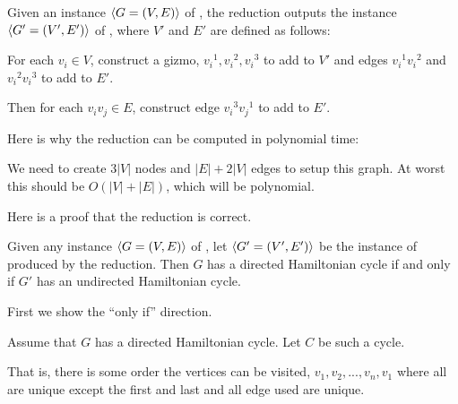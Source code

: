 \documentclass[11pt]{article}
\begin{document}
\begin{problems}


  \problem %

  Given an instance $\langle G=(V,E) \rangle$ of ,
  the reduction outputs the instance $\langle G'=(V',E') \rangle$ of ,
  where $V'$ and $E'$ are defined as follows:

  \lineacross 
  For each $v_i \in V$, construct a gizmo, ${v_i}^1, {v_i}^2, {v_i}^3$ to add to $V'$ and edges ${v_i}^1{v_i}^2$ and ${v_i}^2{v_i}^3$ to add to $E'$.

  Then for each $v_iv_j \in E$, construct edge ${v_i}^3{v_j}^1$ to add to $E'$.
  \lineacross 

  \medskip 
  Here is why the reduction can be computed in polynomial time:

  \lineacross 
  We need to create $3|V|$ nodes and $|E| + 2|V|$ edges to setup this graph. At worst this should be $O(|V| + |E|)$, which will be polynomial.
  \lineacross 

  \medskip 
  Here is a proof that the reduction is correct.
  \begin{lemma}
    Given any instance $\langle G=(V,E) \rangle$ of ,
    let $\langle G'=(V',E') \rangle$ be the instance of  produced by the reduction.
    Then $G$ has a directed Hamiltonian cycle 
    if and only if $G'$ has an undirected Hamiltonian cycle.
  \end{lemma}
  \begin{longFormProof}
    \step First we show the ``only if'' direction.
    \begin{block}[2oi]
      {Assume that $G$ has a directed Hamiltonian cycle.}
      \step Let $C$ be such a cycle.

      \step That is, there is some order the vertices can be visited, $v_1, v_2, ..., v_n, v_1$ where all are unique except the first and last and all edge used are unique.


\end{block}
\end{longFormProof}
\end{problems}
\end{document}
